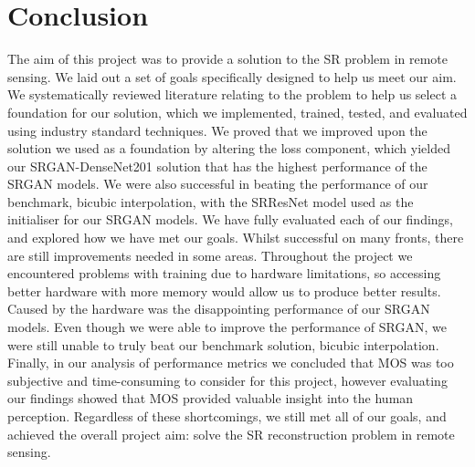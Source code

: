 \section{Conclusion}
The aim of this project was to provide a solution to the SR problem in remote sensing. We laid out a set of goals specifically designed to help us meet our aim. We systematically reviewed literature relating to the problem to help us select a foundation for our solution, which we implemented, trained, tested, and evaluated using industry standard techniques. We proved that we improved upon the solution we used as a foundation by altering the loss component, which yielded our SRGAN-DenseNet201 solution that has the highest performance of the SRGAN models. We were also successful in beating the performance of our benchmark, bicubic interpolation, with the SRResNet model used as the initialiser for our SRGAN models. We have fully evaluated each of our findings, and explored how we have met our goals. Whilst successful on many fronts, there are still improvements needed in some areas. Throughout the project we encountered problems with training due to hardware limitations, so accessing better hardware with more memory would allow us to produce better results. Caused by the hardware was the disappointing performance of our SRGAN models. Even though we were able to improve the performance of SRGAN, we were still unable to truly beat our benchmark solution, bicubic interpolation. Finally, in our analysis of performance metrics we concluded that MOS was too subjective and time-consuming to consider for this project, however evaluating our findings showed that MOS provided valuable insight into the human perception. Regardless of these shortcomings, we still met all of our goals, and achieved the overall project aim: solve the SR reconstruction problem in remote sensing.

